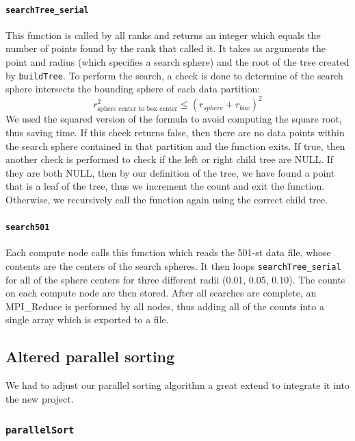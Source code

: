 \documentclass{article}
\begin{document}
\paragraph{\texttt{searchTree\_serial}}
This function is called by all ranks and returns an integer which equals the number of points found by the rank that called it. It takes as arguments the point and radius (which specifies a search sphere) and the root of the tree created by \texttt{buildTree}. To perform the search, a check is done to determine of the search sphere intersects the bounding sphere of each data partition:
\begin{equation}
		r^2_\textrm{sphere center to box center} \le (r_{sphere} + r_{box})^2
\end{equation}
We used the squared version of the formula to avoid computing the square root, thus saving time. If this check returns false, then there are no data points within the search sphere contained in that partition and the function exits. If true, then another check is performed to check if the left or right child tree are NULL. If they are both NULL, then by our definition of the tree, we have found a point that is a leaf of the tree, thus we increment the count and exit the function. Otherwise, we recursively call the function again using the correct child tree.


\paragraph{\texttt{search501}}
%
%

Each compute node calls this function which reads the 501-st data file, whose contents are the centers of the search spheres. It then loops \texttt{searchTree\_serial} for all of the sphere centers for three different radii (0.01, 0.05, 0.10). The counts on each compute node are then stored. After all searches are complete, an MPI\_Reduce is performed by all nodes, thus adding all of the counts into a single array which is exported to a file.


\subsection{Altered parallel sorting}
We had to adjust our parallel sorting algorithm a great extend to integrate it into the new project.


\subsubsection{\texttt{parallelSort}}
\end{document}
